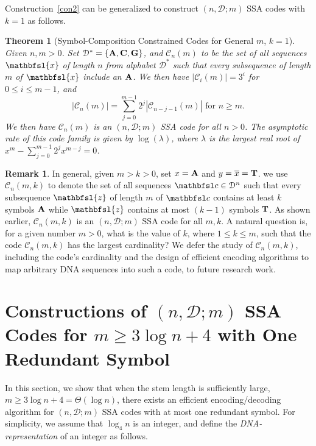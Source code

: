 \documentclass[conference]{IEEEtran}
\theoremstyle{plain}
\newtheorem{theorem}{Theorem}
\theoremstyle{definition}
\newtheorem{remark}{Remark}
\newcommand{\C}{{\mathcal C}}
\newcommand{\D}{{\mathcal D}}
\newcommand{\bc}{{\mathbfsl c}}
\newcommand{\bx}{{\mathbfsl{x}}}
\newcommand{\bz}{{\mathbfsl{z}}}
\renewcommand{\ge}{\geqslant}
\renewcommand{\le}{\leqslant}
\begin{document}
Construction~\ref{con2} can be generalized to construct $(n,\D;m)$ SSA codes with $k=1$ as follows. 

\begin{theorem}[Symbol-Composition Constrained Codes for General $m$, $k=1$]\label{con3}
Given $n,m>0$. Set $\D^*=\{{\bf A}, {\bf C}, {\bf G}\}$, and $\C_n(m)$ to be the set of all sequences $\bx$ of length $n$ from alphabet $\D^*$ such that every subsequence of length $m$ of $\bx$ include an ${\bf A}$. We then have $|\C_i(m)|=3^i$ for $0\le i\le m-1$, and 
\begin{equation*}
|\C_n(m)|=\sum_{j=0}^{m-1} 2^j |\C_{n-j-1}(m)| \text{ for } n\ge m.
\end{equation*}
We then have $\C_n(m)$ is an $(n,\D;m)$ SSA code for all $n>0$. The asymptotic rate of this code family is given by $\log (\lambda)$, where $\lambda$ is the largest real root of $x^m-\sum_{j=0}^{m-1} 2^j x^{m-j}=0$.  
\end{theorem} 

\begin{remark} In general, given $m>k>0$, set $x={\bf A}$ and $y=\overline{x}={\bf T}$. we use $\C_n(m,k)$ to denote the set of all sequences $\bc\in\D^n$ such that every subsequence $\bz$ of length $m$ of $\bc$ contains at least $k$ symbols ${\bf A}$ while $\bz$ contains at most $(k-1)$ symbols ${\bf T}$. As shown earlier, $\C_n(m,k)$ is an $(n,\D;m)$ SSA code for all $m,k$. A natural question is, for a given number $m>0$, what is the value of $k$, where $1\le k\le m$, such that the code $\C_n(m,k)$ has the largest cardinality? We defer the study of $\C_n(m,k)$, including the code's cardinality and the design of efficient encoding algorithms to map arbitrary DNA sequences into such a code, to future research work. 
\end{remark}








\section{Constructions of $(n,\D;m)$ SSA Codes for $m\ge 3\log n+4$ with One Redundant Symbol} 

In this section, we show that when the stem length is sufficiently large, $m \ge 3\log n+4=\Theta(\log n)$, there exists an efficient encoding/decoding algorithm for $(n,\D;m)$ SSA codes with at most one redundant symbol. For simplicity, we assume that $\log_4 n$ is an integer, and define the {\em DNA-representation} of an integer as follows.  
\end{document}

